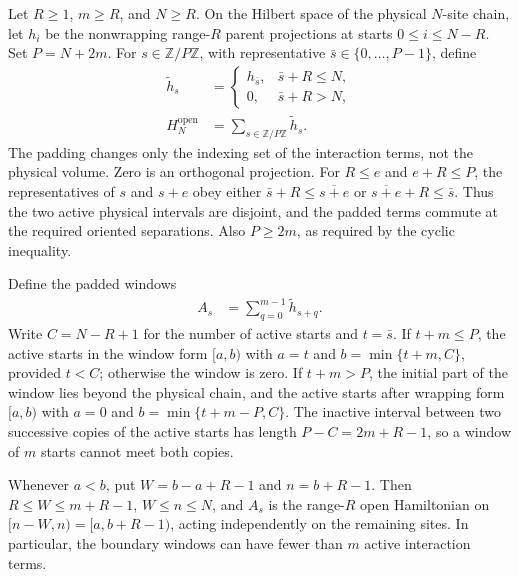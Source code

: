 \documentclass{article}
\begin{document}
Let $R\geq1$, $m\geq R$, and $N\geq R$. On the Hilbert space of the
physical $N$-site chain, let $h_i$ be the nonwrapping range-$R$ parent
projections at starts $0\leq i\leq N-R$. Set $P=N+2m$. For
$s\in\mathbb Z/P\mathbb Z$, with representative
$\bar s\in\{0,\ldots,P-1\}$, define
\begin{align}
    \widetilde h_s
        &=\begin{cases}
            h_{\bar s},&\bar s+R\leq N,\\
            0,&\bar s+R>N,
          \end{cases}
    \label{eq:knabe_open_padding}\\
    H_N^{\mathrm{open}}
        &=\sum_{s\in\mathbb Z/P\mathbb Z}\widetilde h_s.
    \label{eq:knabe_open_sum}
\end{align}
The padding changes only the indexing set of the interaction terms, not the
physical volume. Zero is an orthogonal projection. For $R\leq e$ and
$e+R\leq P$, the representatives of $s$ and $s+e$ obey either
$\bar s+R\leq\overline{s+e}$ or
$\overline{s+e}+R\leq\bar s$. Thus the two active physical intervals
are disjoint, and the padded terms commute at the required oriented
separations. Also $P\geq2m$, as required by the cyclic inequality.

Define the padded windows
\begin{align}
    A_s&=\sum_{q=0}^{m-1}\widetilde h_{s+q}.
    \label{eq:knabe_open_windows}
\end{align}
Write $C=N-R+1$ for the number of active starts and $t=\bar s$.
If $t+m\leq P$, the active starts in the window form
$[a,b)$ with $a=t$ and $b=\min\{t+m,C\}$, provided $t<C$;
otherwise the window is zero. If $t+m>P$, the initial part of the
window lies beyond the physical chain, and the active starts after wrapping
form $[a,b)$ with $a=0$ and $b=\min\{t+m-P,C\}$.
The inactive interval between two successive copies of the active starts
has length $P-C=2m+R-1$, so a window of $m$ starts cannot meet both copies.

Whenever $a<b$, put $W=b-a+R-1$ and $n=b+R-1$.
Then $R\leq W\leq m+R-1$, $W\leq n\leq N$, and $A_s$ is the
range-$R$ open Hamiltonian on $[n-W,n)=[a,b+R-1)$, acting independently
on the remaining sites. In particular, the boundary windows can have
fewer than $m$ active interaction terms.
\end{document}
